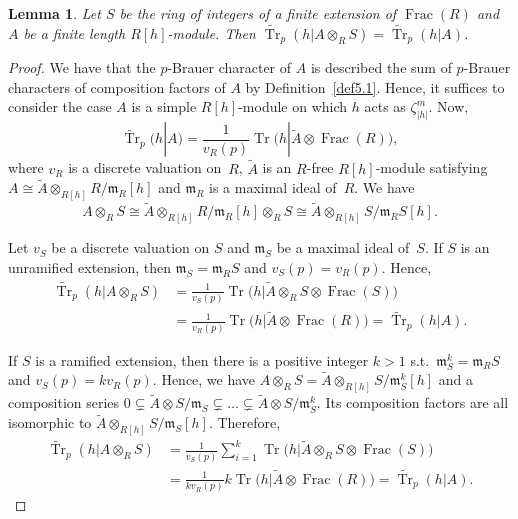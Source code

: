 \documentclass[pdftex]{sigma}%
\numberwithin{equation}{section}
\newtheorem{Lemma}[Theorem]{Lemma}
\begin{document}
\begin{Lemma}\label{tensorBch}
Let $S$ be the ring of integers of a finite extension of $\operatorname{Frac}(R)$ and $A$ be a finite length $R[h]$-module. Then $\widetilde{\operatorname{Tr}}_p(h|A\otimes_{R}S)=\widetilde{\operatorname{Tr}}_p(h|A)$.
\end{Lemma}

\begin{proof}
We have that the $p$-Brauer character of $A$ is described the sum of $p$-Brauer characters of composition factors of $A$ by Definition~\ref{def5.1}. Hence, it suffices to consider the case $A$ is a simple $R[h]$-module on which $h$ acts as $\zeta_{|h|}^m$. Now,
\[
\widetilde{\operatorname{Tr}}_p(h|A)=\frac{1}{v_R(p)}\operatorname{Tr} \big(h|\widetilde{A}\otimes \operatorname{Frac}(R)\big),
\]
where $v_R$ is a discrete valuation on~$R$, $\widetilde{A}$ is an $R$-free $R[h]$-module satisfying $A\cong \widetilde{A}\otimes_{R[h]} R/\mathfrak{m}_R[h]$ and $\mathfrak{m}_R$ is a maximal ideal of~$R$. We have
\[
A\otimes_R S\cong \widetilde{A}\otimes_{R[h]} R/\mathfrak{m}_R[h]\otimes_R S\cong \widetilde{A}\otimes_{R[h]} S/\mathfrak{m}_RS[h].
\]

 Let $v_S$ be a discrete valuation on $S$ and $\mathfrak{m}_S$ be a maximal ideal of~$S$. If $S$ is an unramified extension, then $\mathfrak{m}_S=\mathfrak{m}_RS$ and $v_S(p)=v_R(p)$. Hence,
 \begin{align*}
\widetilde{\operatorname{Tr}}_p(h|A\otimes_R S) &=\frac{1}{v_S(p)}\operatorname{Tr}\big(h|\widetilde{A}\otimes_R S\otimes \operatorname{Frac}(S)\big)\\
& =\frac{1}{v_R(p)}\operatorname{Tr}\big(h|\widetilde{A}\otimes \operatorname{Frac}(R)\big)=\widetilde{\operatorname{Tr}}_p(h|A).
 \end{align*}

 If $S$ is a ramified extension, then there is a positive integer $k>1$ s.t.\ $\mathfrak{m}_S^k=\mathfrak{m}_RS$ and $v_S(p)=kv_R(p)$. Hence, we have $A\otimes_R S=\widetilde{A}\otimes_{R[h]}S/\mathfrak{m}_S^k[h]$ and a composition series $0\subsetneq \widetilde{A}\otimes S/\mathfrak{m}_S\subsetneq \dots \subsetneq \widetilde{A}\otimes S/\mathfrak{m}_S^k$. Its composition factors are all isomorphic to $\widetilde{A}\otimes_{R[h]} S/\mathfrak{m}_S[h]$. Therefore,
\begin{align*}
\widetilde{\operatorname{Tr}}_p(h|A\otimes_R S) & =\frac{1}{v_S(p)}\sum_{i=1}^k\operatorname{Tr} \big(h|\widetilde{A}\otimes_R S\otimes \operatorname{Frac}(S)\big)\\
& =\frac{1}{kv_R(p)}k\operatorname{Tr}\big(h|\widetilde{A}\otimes \operatorname{Frac}(R)\big) =\widetilde{\operatorname{Tr}}_p(h|A).\tag*{\qed}
\end{align*}\renewcommand{\qed}{}
\end{proof}
\end{document}
